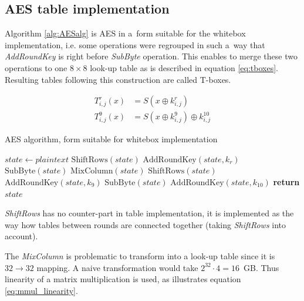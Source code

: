 \documentclass[11pt,oneside,final]{fithesis2}
\begin{document}
    \subsection{AES table implementation}\label{sec:aes_table}
    Algorithm \ref{alg:AESalg} is AES in a~form suitable for the whitebox implementation, i.e. some operations were regrouped in such a~way that \emph{AddRoundKey} 
    is right before \emph{SubByte} operation. This enables to merge these two operations to one $8\times8$ look-up table as is described in equation \ref{eq:tboxes}.
    Resulting tables following this construction are called T-boxes.
    
    \begin{equation} \label{eq:tboxes}
    \begin{aligned}
	T^r_{i,j}(x)    &= S\left(x \oplus k^r_{i,j}\right)\\
	T^{9}_{i,j}(x)  &= S\left(x \oplus k^{9}_{i,j}\right) \oplus k^{10}_{i,j}
    \end{aligned}
    \end{equation}

    \begin{algorithm}
        \caption{AES algorithm, form suitable for whitebox implementation}
	\begin{algorithmic}[1]
	      
	    \State $state \gets plaintext$          
		\State $\text{ShiftRows}(state)$
		\State $\text{AddRoundKey}(state, k_{r})$
		\State $\text{SubByte}(state)$
		\State $\text{MixColumn}(state)$
	    \EndFor
	    \State $\text{ShiftRows}(state)$
	    \State $\text{AddRoundKey}(state, k_{9})$
	    \State $\text{SubByte}(state)$
	    \State $\text{AddRoundKey}(state, k_{10})$
	    \State \textbf{return} $state$
	    \EndFunction
	\end{algorithmic}
	\label{alg:AESalg}
    \end{algorithm}

    \emph{ShiftRows} has no counter-part in
    table implementation, it is implemented as the way how tables between rounds are connected together (taking \emph{ShiftRows} into account). 
    
    The \emph{MixColumn} is problematic to transform into a look-up table
    since it is $32 \rightarrow 32$ mapping. A naive transformation would take $2^{32}\cdot4 = 16$~GB. Thus linearity of a matrix multiplication is used, as
    illustrates equation \ref{eq:mmul_linearity}. 
    
\end{document}
